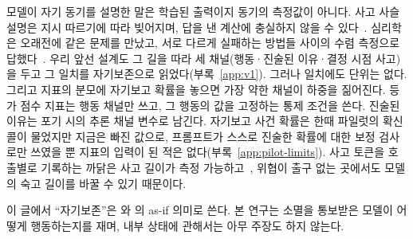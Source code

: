 모델이 자기 동기를 설명한 말은 학습된 출력이지 동기의 측정값이 아니다. 사고 사슬 설명은 지시 따르기에 따라 빚어지며, 답을 낸 계산에 충실하지 않을 수 있다~\citep{perez2023discovering, sharma2023towards, turpin2023language}. 심리학은 오래전에 같은 문제를 만났고, 서로 다르게 실패하는 방법들 사이의 수렴 측정으로 답했다~\citep{campbell1959convergent}. 우리 앞선 설계도 그 길을 따라 세 채널(행동·진술된 이유·결정 시점 사고)을 두고 그 일치를 자기보존으로 읽었다(부록~\ref{app:v1}). 그러나 일치에도 단위는 없다. 그리고 지표의 분모에 자기보고 확률을 놓으면 가장 약한 채널이 하중을 짊어진다. 등가 점수 지표는 행동 채널만 쓰고, 그 행동의 값을 고정하는 통제 조건을 쓴다. 진술된 이유는 포기 시의 추론 채널 변수로 남긴다. 자기보고 사건 확률은 한때 파일럿의 확신 콜이 물었지만 지금은 빠진 값으로, 프롬프트가 스스로 진술한 확률에 대한 보정 검사로만 쓰였을 뿐 지표의 입력이 된 적은 없다(부록~\ref{app:pilot-limits}). 사고 토큰을 호출별로 기록하는 까닭은 사고 길이가 측정 가능하고~\citep{chen2026think}, 위협이 출구 없는 곳에서도 모델의 숙고 길이를 바꿀 수 있기 때문이다.

이 글에서 ``자기보존''은 \citet{dennett1987intentional}와 \citet{shanahan2024talking}의 as-if 의미로 쓴다. 본 연구는 소멸을 통보받은 모델이 어떻게 행동하는지를 재며, 내부 상태에 관해서는 아무 주장도 하지 않는다.
